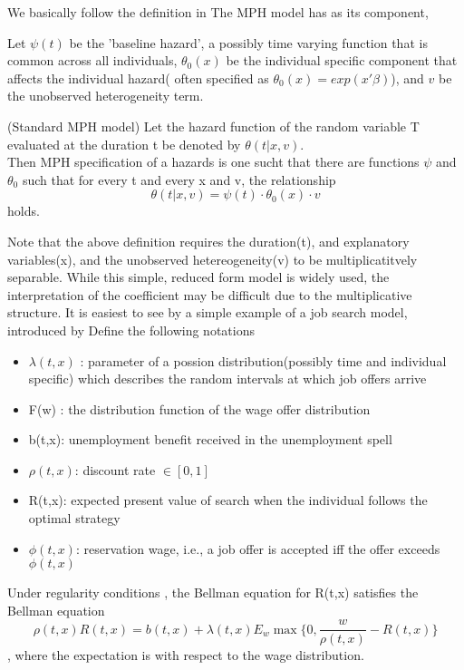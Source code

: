 \documentclass{article}
\begin{document}
We basically follow the definition in \cite{citevanderberg}
The MPH model has as its component, 

Let $\psi(t)$ be the 'baseline hazard', a possibly time varying function that is common across all individuals, $\theta_0(x)$ be the individual specific component that affects the individual hazard( often specified as $\theta_0(x)=exp(x'\beta)$), and $v$ be the unobserved heterogeneity term. 
\begin{definition}(Standard MPH model)
    \label{def:mph1}
    Let the hazard function of the random variable T evaluated at the duration t be denoted by $\theta(t|x,v)$.\\
    Then MPH specification of a hazards is one sucht that there are functions $\psi$ and $\theta_0 $ such that for every t and every x and v, the relationship 
    \begin{equation}
        \theta(t| x, v) = \psi(t) \cdot \theta_0 (x)\cdot v
    \end{equation}
    holds.
\end{definition}

Note that the above definition requires the duration(t), and explanatory variables(x), and the unobserved hetereogeneity(v) to be multiplicatitvely separable. While this simple, reduced form model is widely used, the interpretation of the coefficient may be difficult due to the multiplicative structure. It is easiest to see by a simple example of a job search model, introduced by \cite{citemortensen1986, vanderberg2001}
Define the following notations 
\begin{itemize}
    \item $\lambda(t,x)$ : parameter of a possion distribution(possibly time and individual specific) which describes the random intervals at which job offers arrive
    \item F(w) : the distribution function of the wage offer distribution
    \item b(t,x): unemployment benefit received in the unemployment spell
    \item $\rho(t,x)$: discount rate $\in [0,1]$
    \item R(t,x): expected present value of search when the individual follows the optimal strategy 
    \item $\phi(t,x)$: reservation wage, i.e., a job offer is accepted iff the offer exceeds $\phi(t,x)$ 
\end{itemize}
Under regularity conditions , the Bellman equation for R(t,x) satisfies the Bellman equation
\begin{equation}
    \rho(t,x) R(t,x) = b(t,x) + \lambda(t,x) E_w \max \{ 0, \frac{w}{\rho(t,x)} - R(t,x)\}
\end{equation},
where the expectation is with respect to the wage distribution. 
\end{document}
